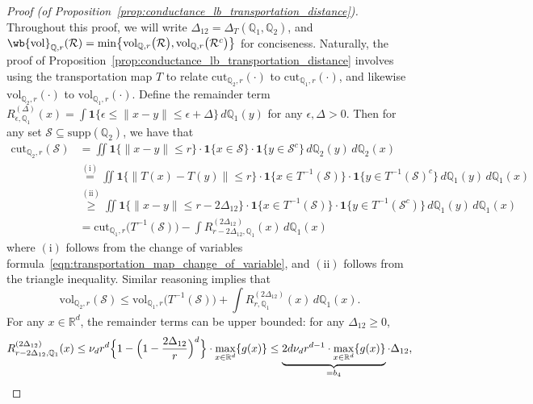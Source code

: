 \documentclass{article}
\newcommand{\Reals}{\mathbb{R}}
\newcommand{\vol}{\mathrm{vol}}
\newcommand{\cut}{\mathrm{cut}}
\newcommand{\1}{\mathbf{1}}
\newcommand{\Rd}{\Reals^d}
\newcommand{\mc}[1]{\mathcal{#1}}
\newcommand{\mbb}[1]{\mathbb{#1}}
\theoremstyle{definition}
\theoremstyle{remark}
\begin{document}
\begin{proof}[Proof (of Proposition~\ref{prop:conductance_lb_transportation_distance})]
	Throughout this proof, we will write $\Delta_{12} = \Delta_T(\mbb{Q}_1,\mbb{Q}_2)$, and $\wb{\vol}_{\mbb{Q},r}(\mc{R}) = \min\bigl\{\vol_{\mbb{Q},r}\bigl(\mc{R}\bigr),\vol_{\mbb{Q},r}\bigl(\mc{R}^c\bigr)\bigr\}$ for conciseness. Naturally, the proof of Proposition~\ref{prop:conductance_lb_transportation_distance} involves using the transportation map $T$ to relate $\cut_{\mbb{Q}_2,r}(\cdot)$ to $\cut_{\mbb{Q}_1,r}(\cdot)$, and likewise $\vol_{\mbb{Q}_2,r}(\cdot)$ to $\vol_{\mbb{Q}_1,r}(\cdot)$. Define the remainder term $R_{\epsilon,\mbb{Q}_1}^{(\Delta)}(x) = \int \1\{\epsilon \leq \|x - y\| \leq \epsilon + \Delta\} \,d\mbb{Q}_1(y)$ for any $\epsilon, \Delta > 0$. Then for any set $\mc{S} \subseteq \mathrm{supp}(\mbb{Q}_2)$, we have that
	\begin{align}
	\cut_{\mbb{Q}_2,r}(\mc{S}) & = \iint \1\{\|x - y\|\leq r\} \cdot \1\{x \in \mc{S} \} \cdot \1\{y \in \mc{S}^c \} \,d\mbb{Q}_2(y) \,d\mbb{Q}_2(x) \nonumber \\ 
	& \overset{\mathrm{(i)}}{=} \iint \1\{\|T(x) - T(y)\|\leq r\} \cdot \1\{x \in T^{-1}(\mc{S}) \} \cdot \1\{y \in T^{-1}(\mc{S})^c \} \,d\mbb{Q}_1(y) \,d\mbb{Q}_1(x) \nonumber \\
	& \overset{\mathrm{(ii)}}{\geq} \iint \1\{\|x - y\|\leq r - 2\Delta_{12}\} \cdot \1\{x \in T^{-1}(\mc{S}) \} \cdot \1\{y \in T^{-1}(\mc{S}^c) \} \,d\mbb{Q}_1(y) \,d\mbb{Q}_1(x) \nonumber \\
	& = \cut_{\mbb{Q}_1,r}\bigl(T^{-1}(\mc{S})\bigr) - \int R_{r - 2\Delta_{12} ,\mbb{Q}_1}^{(2\Delta_{12})}(x) \,d\mbb{Q}_1(x) \label{pf:conductance_lb_transportation_distance_1}
	\end{align} 
	where $\mathrm{(i)}$ follows from the change of variables formula~\eqref{eqn:transportation_map_change_of_variable}, and $\mathrm{(ii)}$ follows from the triangle inequality. Similar reasoning implies that
	\begin{equation}
	\label{pf:conductance_lb_transportation_distance_2}
	\vol_{\mbb{Q}_2,r}(\mc{S}) \leq \vol_{\mbb{Q}_1,r}\bigl(T^{-1}(\mc{S})\bigr) + \int R_{r,\mbb{Q}_1}^{(2\Delta_{12})}(x)  \,d\mbb{Q}_1(x).
	\end{equation}
	For any $x \in \Rd$, the remainder terms can be upper bounded: for any $\Delta_{12} \geq 0$,
	\begin{equation*}
	R_{r - 2\Delta_{12} ,\mbb{Q}_1}^{(2\Delta_{12})}(x) \leq \nu_dr^d\Bigl\{1 - \Bigl(1 - \frac{2\Delta_{12}}{r}\Bigr)^d \Bigr\} \cdot \max_{x \in \Rd}\{g(x)\} \leq \underbrace{2 d \nu_d r^{d - 1} \cdot \max_{x \in \Rd}\{g(x)\}}_{= b_4} \cdot \Delta_{12},

\end{equation*}
\end{proof}
\end{document}
